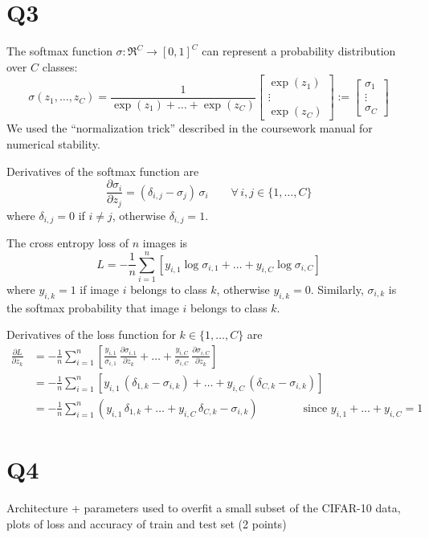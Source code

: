 \documentclass[12pt, a4paper]{article}
\begin{document}
\section*{Q3}
The softmax function $\sigma : \Re^C \rightarrow [0, 1]^C$ can represent a probability distribution over $C$ classes:
\[ \sigma(z_1, \dots, z_C) = \frac{1}{\exp(z_1) + \dots + \exp(z_C)}
   \begin{bmatrix} \exp(z_1) \\ \vdots \\ \exp(z_C) \end{bmatrix} :=
   \begin{bmatrix} \sigma_1  \\ \vdots \\ \sigma_C  \end{bmatrix} \]
We used the ``normalization trick'' described in the coursework manual for numerical stability.\par
\bigskip
Derivatives of the softmax function are
\[ \frac{\partial \sigma_i}{\partial z_j} = (\delta_{i,j} - \sigma_j) \, \sigma_i \qquad \forall \, i, j \in \{1, \dots, C\} \]
where $\delta_{i,j} = 0$ if $i \neq j$, otherwise $\delta_{i,j} = 1$.\par
\bigskip
The cross entropy loss of $n$ images is
\[ L = -\frac1n \sum_{i=1}^n \left[ y_{i,1} \log \sigma_{i,1} + \dots + y_{i,C} \log \sigma_{i,C} \right] \]
where $y_{i,k} = 1$ if image $i$ belongs to class $k$, otherwise $y_{i,k} = 0$. Similarly, $\sigma_{i,k}$ is the softmax probability that image $i$ belongs to class $k$.\par
\bigskip
Derivatives of the loss function for $k \in \{1, \dots, C\}$ are
\begin{align*}
    \frac{\partial L}{\partial z_k}
    &= -\frac1n \sum_{i=1}^n \left[ \frac{y_{i,1}}{\sigma_{i,1}} \, \frac{\partial \sigma_{i,1}}{\partial z_k} + \dots + \frac{y_{i,C}}{\sigma_{i,C}} \, \frac{\partial \sigma_{i,C}}{\partial z_k} \right] \\
    &= -\frac1n \sum_{i=1}^n \left[ y_{i,1} \, (\delta_{1,k} - \sigma_{i,k}) + \dots + y_{i,C} \, (\delta_{C,k} - \sigma_{i,k}) \right] \\
    &= -\frac1n \sum_{i=1}^n \left( y_{i,1} \, \delta_{1,k} + \dots + y_{i,C} \, \delta_{C,k} - \sigma_{i,k} \right) \qquad \qquad \text{since } y_{i,1} + \dots + y_{i,C} = 1
\end{align*}

\section*{Q4}
Architecture + parameters used to overfit a small subset of the CIFAR-10 data, plots of loss and accuracy of train and test set (2 points)
\end{document}
